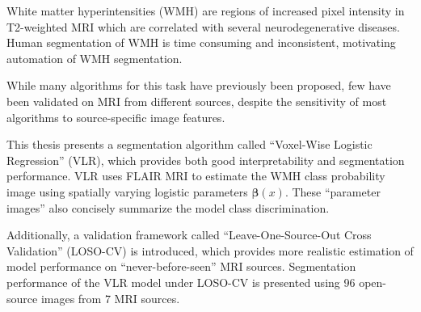 White matter hyperintensities (WMH) are regions of increased pixel intensity
in T2-weighted MRI which are correlated with several neurodegenerative diseases.
Human segmentation of WMH is time consuming and inconsistent,
motivating automation of WMH segmentation.
\par
While many algorithms for this task have previously been proposed,
few have been validated on MRI from different sources,
despite the sensitivity of most algorithms to source-specific image features.
\par
This thesis presents a segmentation algorithm called
``Voxel-Wise Logistic Regression'' (VLR),
which provides both good interpretability and segmentation performance.
VLR uses FLAIR MRI to estimate the WMH class probability image using
spatially varying logistic parameters $\bm{\beta}(x)$.
These ``parameter images'' also concisely summarize the model class discrimination.
\par
Additionally, a validation framework called
``Leave-One-Source-Out Cross Validation'' (LOSO-CV) is introduced,
which provides more realistic estimation of model performance
on ``never-before-seen'' MRI sources.
Segmentation performance of the VLR model under LOSO-CV
is presented using 96 open-source images from 7 MRI sources.
